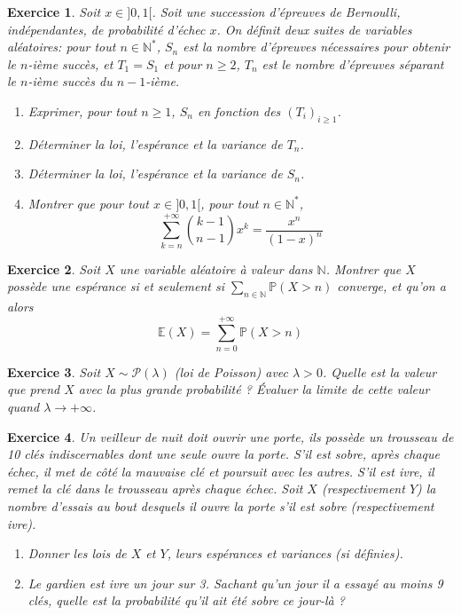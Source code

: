 \documentclass[12pt]{article}
\newtheorem{exercise}{Exercice}[section]
\theoremstyle{remark}
\theoremstyle{remark}
\newcommand{\N}{\mathbb{N}}
\newcommand{\E}{\mathbb{E}}
\renewcommand{\P}{\mathbb{P}}
\begin{document}
\begin{exercise}
	Soit $x\in]0,1[$. Soit une succession d'épreuves de Bernoulli,
	indépendantes, de probabilité d'échec $x$. On définit deux suites de
	variables aléatoires: pour tout $n\in\N^{*}$, $S_{n}$ est la nombre
	d'épreuves nécessaires pour obtenir le $n$-ième succès, et $T_{1}=S_{1}$ et
	pour $n\geqslant2$, $T_{n}$ est le nombre d'épreuves séparant le $n$-ième
	succès du $n-1$-ième.
	\begin{enumerate}
		\item Exprimer, pour tout $n\geqslant1$, $S_{n}$ en fonction des $(T_{i})_{i\geqslant1}$.
		\item Déterminer la loi, l'espérance et la variance de $T_{n}$.
		\item Déterminer la loi, l'espérance et la variance de $S_{n}$.
		\item Montrer que pour tout $x\in]0,1[$, pour tout $n\in\N^{*}$,
		$$\sum_{k=n}^{+\infty}\binom{k-1}{n-1}x^{k}=\frac{x^{n}}{(1-x)^{n}}$$
	\end{enumerate}
\end{exercise}

\begin{exercise}
Soit $X$ une variable aléatoire à valeur dans $\N$. Montrer que $X$ possède une
espérance si et seulement si $\sum_{n\in\N}\P(X>n)$ converge, et qu'on a alors
$$\E(X)=\sum_{n=0}^{+\infty}\P(X>n)$$
\end{exercise}

\begin{exercise}
	Soit $X\sim\mathcal{P}(\lambda)$ (loi de Poisson) avec $\lambda>0$. Quelle est la valeur que
	prend $X$ avec la plus grande probabilité ? Évaluer la limite de cette
	valeur quand $\lambda\to+\infty$.
\end{exercise}

\begin{exercise}
	Un veilleur de nuit doit ouvrir une porte, ils possède un trousseau de 10
	clés indiscernables dont une seule ouvre la porte. S'il est sobre, après
	chaque échec, il met de côté la mauvaise clé et poursuit avec les autres.
	S'il est ivre, il remet la clé dans le trousseau après chaque échec. Soit $X$
	(respectivement $Y$) la nombre d'essais au bout desquels il ouvre la porte
	s'il est sobre (respectivement ivre).
	\begin{enumerate}
		\item Donner les lois de $X$ et $Y$, leurs espérances et variances (si définies).
		\item Le gardien est ivre un jour sur 3. Sachant qu'un jour il a essayé
		au moins 9 clés, quelle est la probabilité qu'il ait été sobre ce
		jour-là ?
	\end{enumerate}
\end{exercise}
\end{document}
